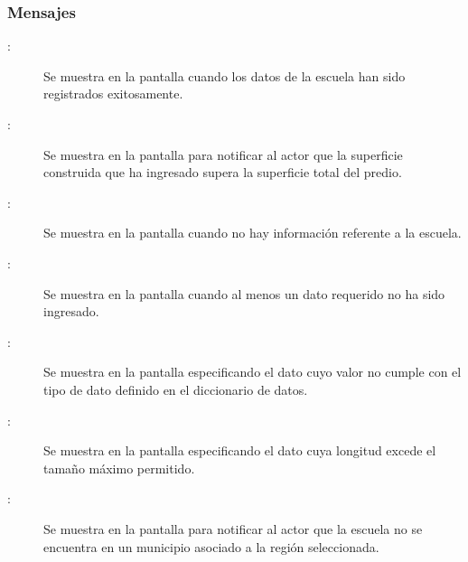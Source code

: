 \subsubsection{Mensajes} 

    \begin{description}
    \item[:] Se muestra en la pantalla  cuando los datos de la escuela han sido registrados exitosamente.
	\item [:] Se muestra en la pantalla  para notificar al actor que la superficie construida que ha ingresado supera la superficie total del predio.      
	\item [:] Se muestra en la pantalla  cuando no hay información referente a la escuela.
    \item[:] Se muestra en la pantalla  cuando al menos un dato requerido no ha sido ingresado.

    \item[:] Se muestra en la pantalla  especificando el dato cuyo valor no cumple con el tipo de dato definido en el diccionario de datos.

    \item[:] Se muestra en la pantalla  especificando el dato cuya longitud excede el tamaño máximo permitido.

    \item[:] Se muestra en la pantalla  para notificar al actor que la escuela no se encuentra en un municipio asociado a la región seleccionada.

    \end{description}
